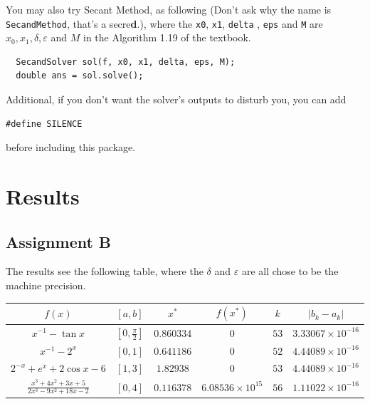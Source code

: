 \documentclass[11pt,en]{elegantpaper}
\begin{document}
You may also try Secant Method, as following (Don't ask why the name is \verb|SecandMethod|, that's a secre\textbf{d}.), where the \verb|x0|, \verb|x1|, \verb|delta| , \verb|eps| and \verb|M| are $x_0,x_1,\delta,\varepsilon$ and $M$ in the Algorithm 1.19 of the textbook.

\begin{lstlisting}
  SecandSolver sol(f, x0, x1, delta, eps, M);
  double ans = sol.solve();
\end{lstlisting}

Additional, if you don't want the solver's outputs to disturb you, you can add
\begin{lstlisting}
#define SILENCE
\end{lstlisting}
before including this package.

\section{Results}

\subsection{Assignment B}

The results see the following table, where the $\delta$ and $\varepsilon$ are all chose to be the machine precision.

\begin{table}[htbp]
  \centering
  \begin{tabular}{|c|c|c|c|c|c|}
  \hline
  \textbf{$f(x)$}                         & \textbf{$[a,b]$}    & \textbf{$x^*$} & \textbf{$f(x^*)$}       & \textbf{$k$} & \textbf{$|b_k-a_k|$}     \\ \hline
  $x^{-1}-\tan x$                         & $[0,\frac{\pi}{2}]$ & $0.860334$     & $0$                     & $53$         & $3.33067\times 10^{-16}$ \\ \hline
  $x^{-1}-2^x$                            & $[0,1]$             & $0.641186$     & $0$                     & $52$         & $4.44089\times 10^{-16}$ \\ \hline
  $2^{-x}+e^x+2\cos x-6$                  & $[1,3]$             & $1.82938$      & $0$                     & $53$         & $4.44089\times 10^{-16}$ \\ \hline
  $\frac{x^3+4x^2+3x+5}{2x^3-9x^2+18x-2}$ & $[0,4]$             & $0.116378$     & $6.08536\times 10^{15}$ & $56$         & $1.11022\times 10^{-16}$ \\ \hline
  \end{tabular}
\end{table}
\end{document}
